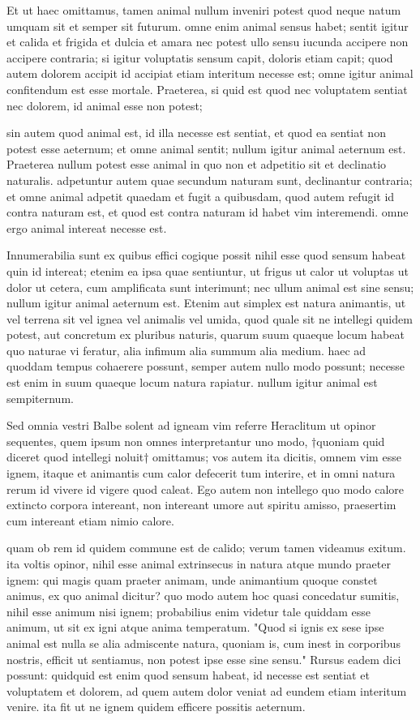  Et ut haec omittamus, tamen animal nullum inveniri potest quod neque natum umquam sit et semper sit futurum. omne enim animal sensus habet; sentit igitur et calida et frigida et dulcia et amara nec potest ullo sensu iucunda accipere non accipere contraria; si igitur voluptatis sensum capit, doloris etiam capit; quod autem dolorem accipit id accipiat etiam interitum necesse est; omne igitur animal confitendum est esse mortale. Praeterea, si quid est quod nec voluptatem sentiat nec dolorem, id animal esse non potest;

 sin autem quod animal est, id illa necesse est sentiat, et quod ea sentiat non potest esse aeternum; et omne animal sentit; nullum igitur animal aeternum est. Praeterea nullum potest esse animal in quo non et adpetitio sit et declinatio naturalis. adpetuntur autem quae secundum naturam sunt, declinantur contraria; et omne animal adpetit quaedam et fugit a quibusdam, quod autem refugit id contra naturam est, et quod est contra naturam id habet vim interemendi. omne ergo animal intereat necesse est.

 Innumerabilia sunt ex quibus effici cogique possit nihil esse quod sensum habeat quin id intereat; etenim ea ipsa quae sentiuntur, ut frigus ut calor ut voluptas ut dolor ut cetera, cum amplificata sunt interimunt; nec ullum animal est sine sensu; nullum igitur animal aeternum est. Etenim aut simplex est natura animantis, ut vel terrena sit vel ignea vel animalis vel umida, quod quale sit ne intellegi quidem potest, aut concretum ex pluribus naturis, quarum suum quaeque locum habeat quo naturae vi feratur, alia infimum alia summum alia medium. haec ad quoddam tempus cohaerere possunt, semper autem nullo modo possunt; necesse est enim in suum quaeque locum natura rapiatur. nullum igitur animal est sempiternum.

 Sed omnia vestri Balbe solent ad igneam vim referre Heraclitum ut opinor sequentes, quem ipsum non omnes interpretantur uno modo, †quoniam quid diceret quod intellegi noluit† omittamus; vos autem ita dicitis, omnem vim esse ignem, itaque et animantis cum calor defecerit tum interire, et in omni natura rerum id vivere id vigere quod caleat. Ego autem non intellego quo modo calore extincto corpora intereant, non intereant umore aut spiritu amisso, praesertim cum intereant etiam nimio calore.

 quam ob rem id quidem commune est de calido; verum tamen videamus exitum. ita voltis opinor, nihil esse animal extrinsecus in natura atque mundo praeter ignem: qui magis quam praeter animam, unde animantium quoque constet animus, ex quo animal dicitur? quo modo autem hoc quasi concedatur sumitis, nihil esse animum nisi ignem; probabilius enim videtur tale quiddam esse animum, ut sit ex igni atque anima temperatum. "Quod si ignis ex sese ipse animal est nulla se alia admiscente natura, quoniam is, cum inest in corporibus nostris, efficit ut sentiamus, non potest ipse esse sine sensu." Rursus eadem dici possunt: quidquid est enim quod sensum habeat, id necesse est sentiat et voluptatem et dolorem, ad quem autem dolor veniat ad eundem etiam interitum venire. ita fit ut ne ignem quidem efficere possitis aeternum.

